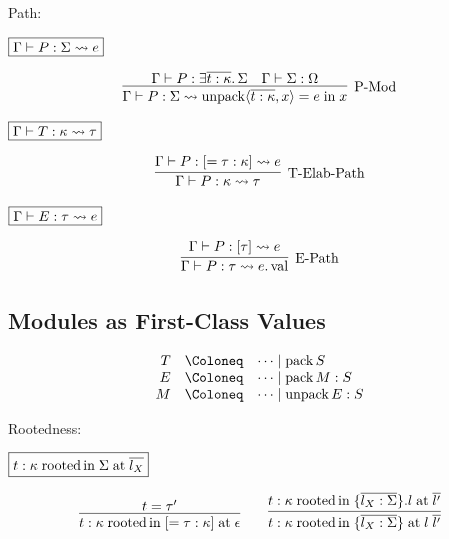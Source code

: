 Path:

$\fbox{$\Gamma \vdash P: \Sigma \rightsquigarrow e$}$

\begin{gather*}
  \infer[\text{P-Mod}]{\Gamma \vdash P: \Sigma \elaborate \symunpack\langle \overline{t: \kappa}, x\rangle = e \symin x}{
    \Gamma \vdash P: \exists \overline{t: \kappa}\ldotp \Sigma
    &
    \Gamma \vdash \Sigma: \Omega
  }
\end{gather*}

$\fbox{$\Gamma \vdash T: \kappa \rightsquigarrow \tau$}$

\begin{gather*}
  \infer[\text{T-Elab-Path}]{\Gamma \vdash P: \kappa \elaborate \tau}{
    \Gamma \vdash P: [= \tau: \kappa] \elaborate e
  }
\end{gather*}

$\fbox{$\Gamma \vdash E: \tau \rightsquigarrow e$}$

\begin{gather*}
  \infer[\text{E-Path}]{\Gamma \vdash P: \tau \elaborate e.\symval}{
    \Gamma \vdash P: [\tau] \elaborate e
  }
\end{gather*}

\subsection{Modules as First-Class Values}

\begin{align*}
  \begin{array}{rcl}
  T & \Coloneq & \cdots \mid \sympack S \\
  E & \Coloneq & \cdots \mid \sympack M: S \\
  M & \Coloneq & \cdots \mid \symunpack E: S
  \end{array}
\end{align*}

Rootedness:

$\fbox{$t: \kappa \mathrel{\mathrm{rooted}}\, \mathrel{\mathrm{in}} \Sigma \mathrel{\mathrm{at}} \overline{l_X}$}$

\begin{gather*}
  \infer{t: \kappa \symrooted\, \symin [= \tau: \kappa] \symat \epsilon}{
    t = \tau'
  }
  \hspace{2em}
  \infer{t: \kappa \symrooted\, \symin \{\overline{l_X: \Sigma}\} \symat l\; \overline{l'}}{
    t: \kappa \symrooted\, \symin \{\overline{l_X: \Sigma}\}.l \symat \overline{l'}
  }
\end{gather*}

